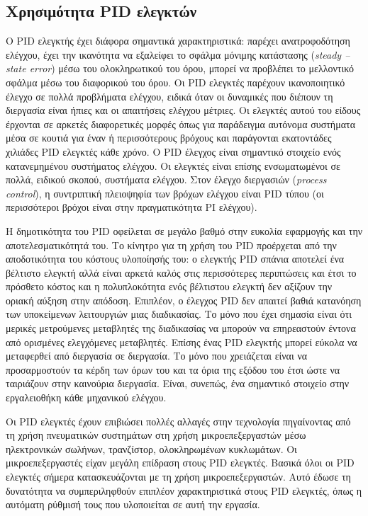 \subsection{Χρησιμότητα PID ελεγκτών}

Ο PID ελεγκτής έχει διάφορα σημαντικά χαρακτηριστικά: παρέχει ανατροφοδότηση ελέγχου, έχει την ικανότητα να εξαλείφει το σφάλμα μόνιμης κατάστασης (\emph{steady -- state error}) μέσω του ολοκληρωτικού του όρου, μπορεί να προβλέπει το μελλοντικό σφάλμα μέσω του διαφορικού του όρου. Οι PID ελεγκτές παρέχουν ικανοποιητικό έλεγχο σε πολλά προβλήματα ελέγχου, ειδικά όταν οι δυναμικές που διέπουν τη διεργασία είναι ήπιες και οι απαιτήσεις ελέγχου μέτριες. Οι ελεγκτές αυτού του είδους έρχονται σε αρκετές διαφορετικές μορφές όπως για παράδειγμα αυτόνομα συστήματα μέσα σε κουτιά για έναν ή περισσότερους βρόχους και παράγονται εκατοντάδες χιλιάδες PID ελεγκτές κάθε χρόνο. Ο PID έλεγχος είναι σημαντικό στοιχείο ενός κατανεμημένου συστήματος ελέγχου. Οι ελεγκτές είναι επίσης ενσωματωμένοι σε πολλά, ειδικού σκοπού, συστήματα ελέγχου. Στον έλεγχο διεργασιών (\emph{process control}), η συντριπτική πλειοψηφία των βρόχων ελέγχου είναι PID τύπου (οι περισσότεροι βρόχοι είναι στην πραγματικότητα PI ελέγχου).

Η δημοτικότητα του PID οφείλεται σε μεγάλο βαθμό στην ευκολία εφαρμογής και την αποτελεσματικότητά του. Το κίνητρο για τη χρήση του PID προέρχεται από την αποδοτικότητα του κόστους υλοποίησής του: ο ελεγκτής PID σπάνια αποτελεί ένα βέλτιστο ελεγκτή αλλά είναι αρκετά καλός στις περισσότερες περιπτώσεις και έτσι το πρόσθετο κόστος και η πολυπλοκότητα ενός βέλτιστου ελεγκτή δεν αξίζουν την οριακή αύξηση στην απόδοση. Επιπλέον, ο έλεγχος PID δεν απαιτεί βαθιά κατανόηση των υποκείμενων λειτουργιών μιας διαδικασίας. Το μόνο που έχει σημασία είναι ότι μερικές μετρούμενες μεταβλητές της διαδικασίας να μπορούν να επηρεαστούν έντονα από ορισμένες ελεγχόμενες μεταβλητές. Επίσης ένας PID ελεγκτής μπορεί εύκολα να μεταφερθεί από διεργασία σε διεργασία. Το μόνο που χρειάζεται είναι να προσαρμοστούν τα κέρδη των όρων του και τα όρια της εξόδου του έτσι ώστε να ταιριάζουν στην καινούρια διεργασία.
Είναι, συνεπώς, ένα σημαντικό στοιχείο στην εργαλειοθήκη κάθε μηχανικού ελέγχου. 

Οι PID ελεγκτές έχουν επιβιώσει πολλές αλλαγές στην τεχνολογία πηγαίνοντας από τη χρήση πνευματικών συστημάτων στη χρήση μικροεπεξεργαστών μέσω ηλεκτρονικών σωλήνων, τρανζίστορ, ολοκληρωμένων κυκλωμάτων. Οι μικροεπεξεργαστές είχαν μεγάλη επίδραση στους PID ελεγκτές. Βασικά όλοι οι PID ελεγκτές σήμερα κατασκευάζονται με τη χρήση μικροεπεξεργαστών. Αυτό έδωσε τη δυνατότητα να συμπεριληφθούν επιπλέον χαρακτηριστικά στους PID ελεγκτές, όπως η αυτόματη ρύθμισή τους που υλοποιείται σε αυτή την εργασία.\newpage

